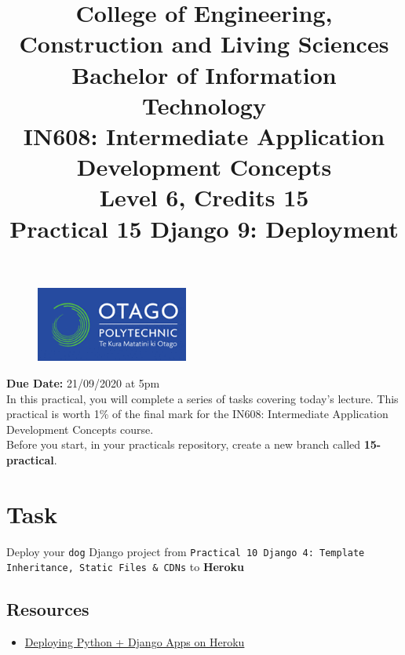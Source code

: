 \documentclass{article}
\author{}
\begin{document}
\begin{figure}
	\centering
	\includegraphics[width=50mm]{./img/logo.png}
\end{figure}

\title{College of Engineering, Construction and Living Sciences\\Bachelor of Information Technology\\IN608: Intermediate Application Development Concepts\\Level 6, Credits 15\\\textbf{Practical 15 Django 9: Deployment}} 
\date{}
\maketitle

\textbf{Due Date:} 21/09/2020 at 5pm \\

In this practical, you will complete a series of tasks covering today's lecture. This practical is worth 1\% of the final mark for the IN608: Intermediate Application Development Concepts course. \\

Before you start, in your practicals repository, create a new branch called \textbf{15-practical}.

\section*{Task} 
Deploy your \texttt{dog} Django project from \texttt{Practical 10 Django 4: Template Inheritance, Static Files \& CDNs} to \textbf{Heroku}

\subsection*{Resources} 
\begin{itemize}
  \item \href{https://devcenter.heroku.com/articles/deploying-python}{Deploying Python + Django Apps on Heroku}
\end{itemize}
\end{document}
